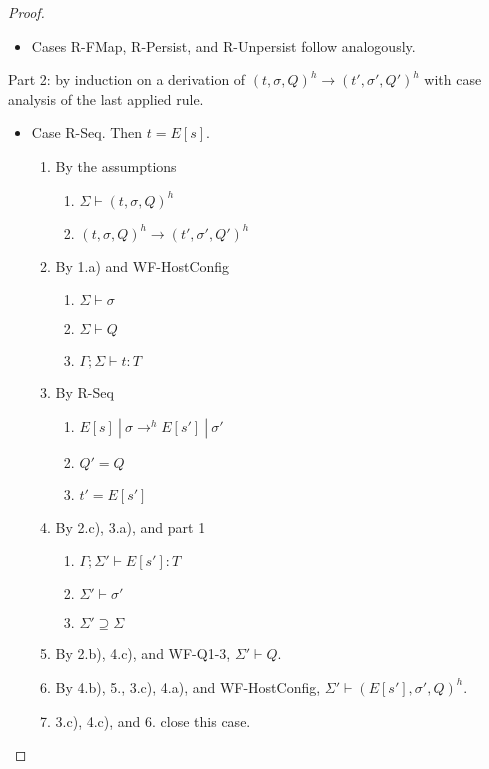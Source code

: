 \documentclass{article}
\theoremstyle{definition}
\begin{document}
\begin{proof}
\begin{itemize}
\item Cases R-FMap, R-Persist, and R-Unpersist follow analogously.
\end{itemize}

% 
Part 2: by induction on a derivation of $(t, \sigma, Q)^h \longrightarrow (t', \sigma', Q')^h$ with case analysis of the last applied rule.

\begin{itemize}

\item Case R-Seq. Then $t = E[s]$.
\begin{enumerate}
\item By the assumptions
  \begin{enumerate}[label=(\alph*)]
  \item $\Sigma \vdash (t, \sigma, Q)^h$
  \item $(t, \sigma, Q)^h \longrightarrow (t', \sigma', Q')^h$
  \end{enumerate}
\item By 1.a) and WF-HostConfig
  \begin{enumerate}[label=(\alph*)]
  \item $\Sigma \vdash \sigma$
  \item $\Sigma \vdash Q$
  \item $\Gamma ; \Sigma \vdash t : T$
  \end{enumerate}
\item By R-Seq
  \begin{enumerate}[label=(\alph*)]
  \item $E[s]~|~\sigma \rightarrow^h E[s']~|~\sigma'$
  \item $Q' = Q$
  \item $t' = E[s']$
  \end{enumerate}
\item By 2.c), 3.a), and part 1
  \begin{enumerate}[label=(\alph*)]
  \item $\Gamma ; \Sigma' \vdash E[s'] : T$
  \item $\Sigma' \vdash \sigma'$
  \item $\Sigma' \supseteq \Sigma$
  \end{enumerate}
\item By 2.b), 4.c), and WF-Q1-3, $\Sigma' \vdash Q$.
\item By 4.b), 5., 3.c), 4.a), and WF-HostConfig, $\Sigma' \vdash (E[s'], \sigma', Q)^h$.
\item 3.c), 4.c), and 6. close this case.
\end{enumerate}


\end{itemize}
\end{proof}
\end{document}
